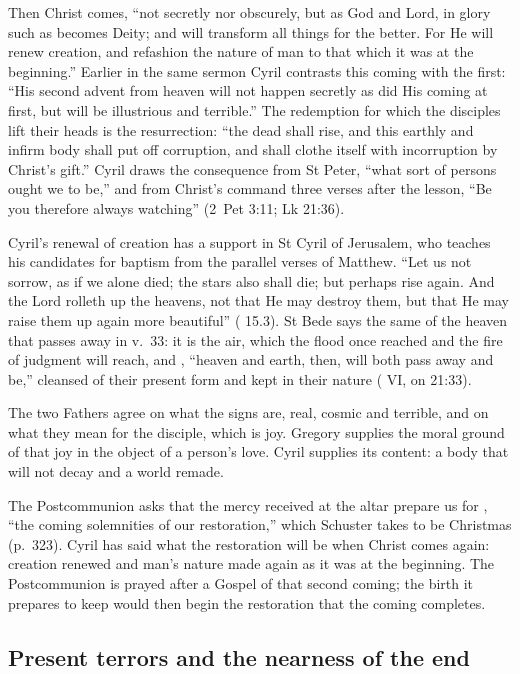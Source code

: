 Then Christ comes, ``not secretly nor obscurely, but as God and Lord, in glory
such as becomes Deity; and will transform all things for the better. For He
will renew creation, and refashion the nature of man to that which it was at
the beginning.'' Earlier in the same sermon Cyril contrasts this coming with
the first: ``His second advent from heaven will not happen secretly as did
His coming at first, but will be illustrious and terrible.'' The redemption
for which the disciples lift their heads is the resurrection: ``the dead
shall rise, and this earthly and infirm body shall put off corruption, and
shall clothe itself with incorruption by Christ's gift.'' Cyril draws the
consequence from St Peter, ``what sort of persons ought we to be,'' and from
Christ's command three verses after the lesson, ``Be you therefore always
watching'' (2~Pet 3:11; Lk 21:36).

Cyril's renewal of creation has a support in St Cyril of Jerusalem, who
teaches his candidates for baptism from the parallel verses of Matthew.
``Let us not sorrow, as if we alone died; the stars also shall die; but
perhaps rise again. And the Lord rolleth up the heavens, not that He may
destroy them, but that He may raise them up again more beautiful''
( 15.3). St Bede says the same of the heaven that
passes away in v.~33: it is the air, which the flood once reached and the
fire of judgment will reach, and , ``heaven and earth, then, will both pass away and be,'' cleansed of their
present form and kept in their nature (
VI, on 21:33).

The two Fathers agree on what the signs are, real, cosmic and terrible, and
on what they mean for the disciple, which is joy. Gregory supplies the moral
ground of that joy in the object of a person's love. Cyril supplies its
content: a body that will not decay and a world remade.

The Postcommunion asks that the mercy received at the altar prepare us for
, ``the coming solemnities of our
restoration,'' which Schuster takes to be Christmas (p.~323). Cyril has said
what the restoration will be when Christ comes again: creation renewed and
man's nature made again as it was at the beginning. The Postcommunion is
prayed after a Gospel of that second coming; the birth it prepares to keep
would then begin the restoration that the coming completes.

\subsection{Present terrors and the nearness of the end}

